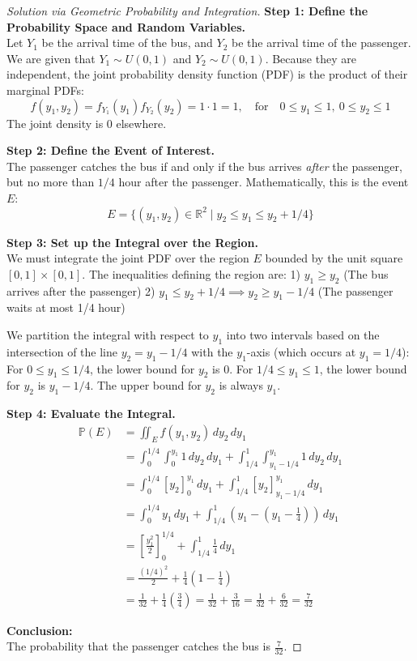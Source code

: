 \documentclass[11pt, a4paper]{article}
\theoremstyle{definition}
\theoremstyle{remark}
\newcommand{\R}{\mathbb{R}}
\newcommand{\Prob}{\mathbb{P}}
\begin{document}
\begin{proof}[Solution via Geometric Probability and Integration]
\textbf{Step 1: Define the Probability Space and Random Variables.}\\
Let $Y_1$ be the arrival time of the bus, and $Y_2$ be the arrival time of the passenger.
We are given that $Y_1 \sim U(0,1)$ and $Y_2 \sim U(0,1)$.
Because they are independent, the joint probability density function (PDF) is the product of their marginal PDFs:
\[
f(y_1, y_2) = f_{Y_1}(y_1) f_{Y_2}(y_2) = 1 \cdot 1 = 1, \quad \text{for} \quad 0 \leq y_1 \leq 1, \ 0 \leq y_2 \leq 1
\]
The joint density is 0 elsewhere.

\textbf{Step 2: Define the Event of Interest.}\\
The passenger catches the bus if and only if the bus arrives \textit{after} the passenger, but no more than $1/4$ hour after the passenger. Mathematically, this is the event $E$:
\[
E = \{ (y_1, y_2) \in \R^2 \mid y_2 \leq y_1 \leq y_2 + 1/4 \}
\]

\textbf{Step 3: Set up the Integral over the Region.}\\
We must integrate the joint PDF over the region $E$ bounded by the unit square $[0,1] \times [0,1]$.
The inequalities defining the region are:
1) $y_1 \geq y_2$ (The bus arrives after the passenger)
2) $y_1 \leq y_2 + 1/4 \implies y_2 \geq y_1 - 1/4$ (The passenger waits at most 1/4 hour)

We partition the integral with respect to $y_1$ into two intervals based on the intersection of the line $y_2 = y_1 - 1/4$ with the $y_1$-axis (which occurs at $y_1 = 1/4$):
For $0 \leq y_1 \leq 1/4$, the lower bound for $y_2$ is $0$.
For $1/4 \leq y_1 \leq 1$, the lower bound for $y_2$ is $y_1 - 1/4$.
The upper bound for $y_2$ is always $y_1$.

\textbf{Step 4: Evaluate the Integral.}\\
\begin{align*}
\Prob(E) &= \iint_E f(y_1, y_2) \, dy_2 \, dy_1 \\
&= \int_{0}^{1/4} \int_{0}^{y_1} 1 \, dy_2 \, dy_1 + \int_{1/4}^{1} \int_{y_1 - 1/4}^{y_1} 1 \, dy_2 \, dy_1 \\
&= \int_{0}^{1/4} [y_2]_{0}^{y_1} \, dy_1 + \int_{1/4}^{1} [y_2]_{y_1 - 1/4}^{y_1} \, dy_1 \\
&= \int_{0}^{1/4} y_1 \, dy_1 + \int_{1/4}^{1} \left( y_1 - \left(y_1 - \frac{1}{4}\right) \right) \, dy_1 \\
&= \left[ \frac{y_1^2}{2} \right]_{0}^{1/4} + \int_{1/4}^{1} \frac{1}{4} \, dy_1 \\
&= \frac{(1/4)^2}{2} + \frac{1}{4} \left( 1 - \frac{1}{4} \right) \\
&= \frac{1}{32} + \frac{1}{4} \left( \frac{3}{4} \right) = \frac{1}{32} + \frac{3}{16} = \frac{1}{32} + \frac{6}{32} = \frac{7}{32}
\end{align*}

\textbf{Conclusion:}\\
The probability that the passenger catches the bus is $\frac{7}{32}$.
\end{proof}
\end{document}

